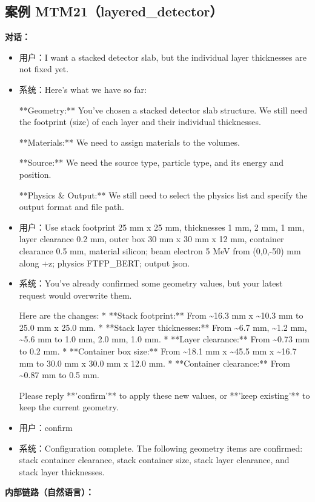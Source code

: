 \documentclass[11pt]{ctexart}
\begin{document}
\subsection{案例 MTM21（layered\_detector）}
\textbf{对话：}
\begin{itemize}
\item 用户：I want a stacked detector slab, but the individual layer thicknesses are not fixed yet.
\item 系统：Here's what we have so far:

**Geometry:** You've chosen a stacked detector slab structure. We still need the footprint (size) of each layer and their individual thicknesses.

**Materials:** We need to assign materials to the volumes.

**Source:** We need the source type, particle type, and its energy and position.

**Physics \& Output:** We still need to select the physics list and specify the output format and file path.
\item 用户：Use stack footprint 25 mm x 25 mm, thicknesses 1 mm, 2 mm, 1 mm, layer clearance 0.2 mm, outer box 30 mm x 30 mm x 12 mm, container clearance 0.5 mm, material silicon; beam electron 5 MeV from (0,0,-50) mm along +z; physics FTFP\_BERT; output json.
\item 系统：You've already confirmed some geometry values, but your latest request would overwrite them.

Here are the changes:
*   **Stack footprint:** From \textasciitilde{}16.3 mm x \textasciitilde{}10.3 mm to 25.0 mm x 25.0 mm.
*   **Stack layer thicknesses:** From \textasciitilde{}6.7 mm, \textasciitilde{}1.2 mm, \textasciitilde{}5.6 mm to 1.0 mm, 2.0 mm, 1.0 mm.
*   **Layer clearance:** From \textasciitilde{}0.73 mm to 0.2 mm.
*   **Container box size:** From \textasciitilde{}18.1 mm x \textasciitilde{}45.5 mm x \textasciitilde{}16.7 mm to 30.0 mm x 30.0 mm x 12.0 mm.
*   **Container clearance:** From \textasciitilde{}0.87 mm to 0.5 mm.

Please reply **'confirm'** to apply these new values, or **'keep existing'** to keep the current geometry.
\item 用户：confirm
\item 系统：Configuration complete. The following geometry items are confirmed: stack container clearance, stack container size, stack layer clearance, and stack layer thicknesses.
\end{itemize}
\textbf{内部链路（自然语言）：}
\end{document}
